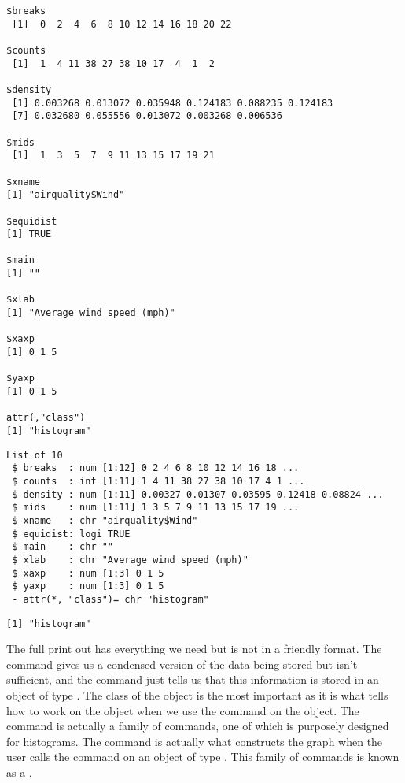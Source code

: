 \begin{knitrout}
\color{fgcolor}\begin{kframe}
\begin{alltt}
\hlstd{> }
\end{alltt}
\begin{verbatim}
$breaks
 [1]  0  2  4  6  8 10 12 14 16 18 20 22

$counts
 [1]  1  4 11 38 27 38 10 17  4  1  2

$density
 [1] 0.003268 0.013072 0.035948 0.124183 0.088235 0.124183
 [7] 0.032680 0.055556 0.013072 0.003268 0.006536

$mids
 [1]  1  3  5  7  9 11 13 15 17 19 21

$xname
[1] "airquality$Wind"

$equidist
[1] TRUE

$main
[1] ""

$xlab
[1] "Average wind speed (mph)"

$xaxp
[1] 0 1 5

$yaxp
[1] 0 1 5

attr(,"class")
[1] "histogram"
\end{verbatim}
\begin{alltt}
\hlstd{> }
\end{alltt}
\begin{verbatim}
List of 10
 $ breaks  : num [1:12] 0 2 4 6 8 10 12 14 16 18 ...
 $ counts  : int [1:11] 1 4 11 38 27 38 10 17 4 1 ...
 $ density : num [1:11] 0.00327 0.01307 0.03595 0.12418 0.08824 ...
 $ mids    : num [1:11] 1 3 5 7 9 11 13 15 17 19 ...
 $ xname   : chr "airquality$Wind"
 $ equidist: logi TRUE
 $ main    : chr ""
 $ xlab    : chr "Average wind speed (mph)"
 $ xaxp    : num [1:3] 0 1 5
 $ yaxp    : num [1:3] 0 1 5
 - attr(*, "class")= chr "histogram"
\end{verbatim}
\begin{alltt}
\hlstd{> }
\end{alltt}
\begin{verbatim}
[1] "histogram"
\end{verbatim}
\end{kframe}
\end{knitrout}
 
The full print out has everything we need but is not in a friendly format. The  command gives us a condensed version of the data being stored but isn't sufficient, and the  command just tells us that this information is stored in an object of type . The class of the object is the most important as it is what tells \R{} how to work on the object when we use the  command on the  object. The  command is actually a family of commands, one of which is purposely designed for histograms. The  command is actually what constructs the graph when the user calls the  command on an object of type . This family of commands is known as a . 
 
